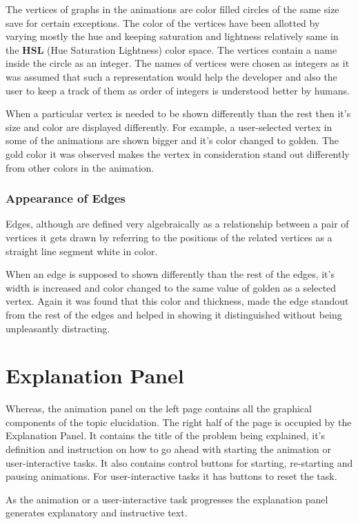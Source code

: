 The vertices of graphs in the animations are color filled circles of the
same size save for certain exceptions. The color of the vertices have been
allotted by varying mostly the hue and keeping saturation and lightness
relatively same in the \textbf{HSL} (Hue Saturation Lightness) color space. The
vertices contain a name inside the circle as an integer. The names of vertices
were chosen as integers as it was assumed that such a representation would help
the developer and also the user to keep a track of them as order of integers
is understood better by humans.

When a particular vertex is needed to be shown differently than the rest then
it's size and color are displayed differently. For example, a user-selected
vertex in some of the animations are shown bigger and it's color changed to
golden. The gold color it was observed makes the vertex in consideration
stand out differently from other colors in the animation.

\subsubsection{Appearance of Edges}
Edges, although are defined very algebraically as a relationship between a pair
of vertices it gets drawn by referring to the positions of the related vertices
as a straight line segment white in color.

When an edge is supposed to shown differently than the rest of the edges, it's
width is increased and color changed to the same value of golden as a selected vertex.
Again it was found that this color and thickness, made the edge standout from the
rest of the edges and helped in showing it distinguished without being unpleasantly
distracting.

\section{Explanation Panel}
Whereas, the animation panel on the left page contains all the graphical
components of the topic elucidation.  The right half of the page is occupied by
the Explanation Panel. It contains the title of the problem being explained,
it's definition and instruction on how to go ahead with starting the animation
or user-interactive tasks.  It also contains control buttons for starting,
re-starting and pausing animations.  For user-interactive tasks it has buttons
to reset the task.

As the animation or a user-interactive task progresses the explanation panel
generates explanatory and instructive text.

